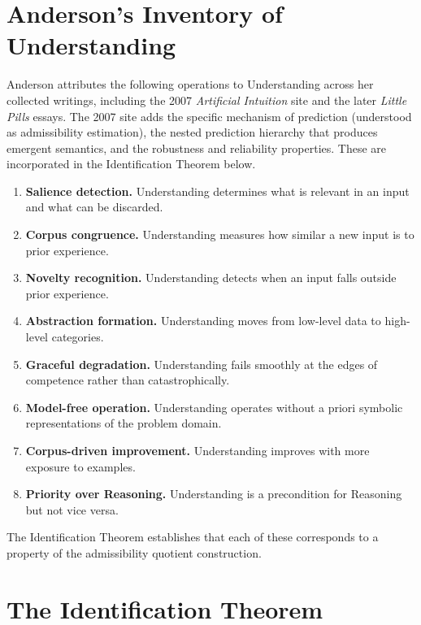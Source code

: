 \documentclass[12pt, a4paper, oneside]{book}
\begin{document}
\section{Anderson's Inventory of Understanding}

Anderson attributes the following operations to Understanding across her
collected writings, including the 2007 \emph{Artificial Intuition} site
and the later \emph{Little Pills} essays. The 2007 site adds the
specific mechanism of prediction (understood as admissibility estimation),
the nested prediction hierarchy that produces emergent semantics, and the
robustness and reliability properties. These are incorporated in the
Identification Theorem below.

\begin{enumerate}
  \item \textbf{Salience detection.} Understanding determines what is
    relevant in an input and what can be discarded.
  \item \textbf{Corpus congruence.} Understanding measures how similar
    a new input is to prior experience.
  \item \textbf{Novelty recognition.} Understanding detects when an
    input falls outside prior experience.
  \item \textbf{Abstraction formation.} Understanding moves from
    low-level data to high-level categories.
  \item \textbf{Graceful degradation.} Understanding fails smoothly at
    the edges of competence rather than catastrophically.
  \item \textbf{Model-free operation.} Understanding operates without
    a priori symbolic representations of the problem domain.
  \item \textbf{Corpus-driven improvement.} Understanding improves with
    more exposure to examples.
  \item \textbf{Priority over Reasoning.} Understanding is a
    precondition for Reasoning but not vice versa.
\end{enumerate}

The Identification Theorem establishes that each of these corresponds to
a property of the admissibility quotient construction.

\section{The Identification Theorem}
\end{document}
